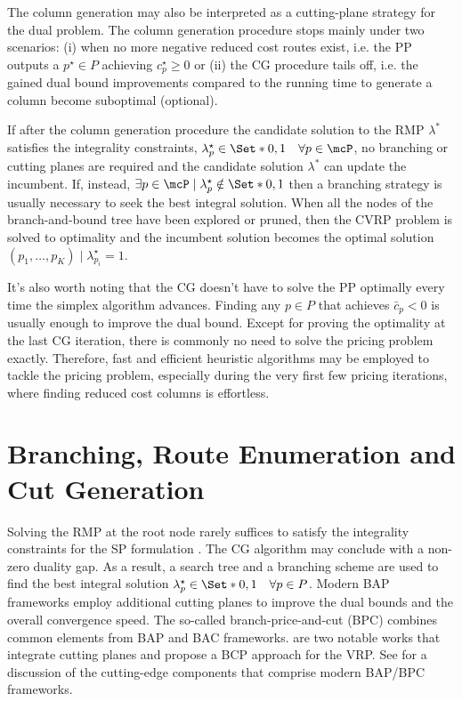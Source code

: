 The column generation may also be interpreted
as a cutting-plane strategy for the dual problem.
The column generation procedure stops mainly under two scenarios:
(i) when no more negative reduced cost routes exist,
i.e. the PP outputs a $p^\star \in P$ achieving $c^\star_p \ge 0$
or
(ii) the CG procedure tails off,
i.e. the gained dual bound improvements
compared to the running time to generate a column
become suboptimal (optional).

If after the column generation procedure
the candidate solution to the RMP $\lambda^*$ satisfies the integrality constraints,
$\lambda^\star_p \in \Set*{0, 1} \quad \forall p \in \mcP$,
no branching or cutting planes are required
and the candidate solution $\lambda^*$ can update the incumbent.
If, instead,
$\exists p \in \mcP \mid \lambda^\star_p \notin \Set*{0, 1}$
then a branching strategy is usually necessary
to seek the best integral solution.
When all the nodes of the branch-and-bound tree have been explored or pruned,
then the CVRP problem is solved to optimality
and the incumbent solution becomes the optimal solution
$(p_1, \dots, p_K) \mid \lambda^\star_{p_i} = 1$.

\medskip

It's also worth noting that
the CG doesn't have to solve the PP optimally
every time the simplex algorithm advances.
Finding any $p \in P$ that achieves $\bar{c}_p < 0$ is usually enough to improve the dual bound.
Except for proving the optimality at the last CG iteration,
there is commonly no need to solve the pricing problem exactly.
Therefore, fast and efficient heuristic algorithms may be employed
to tackle the pricing problem,
especially during the very first few pricing iterations,
where finding reduced cost columns is effortless.

\section{Branching, Route Enumeration and Cut Generation}
\label{sec:branching-and-cut-generation-within-bap-frameworks}

Solving the RMP at the root node rarely suffices to satisfy
the integrality constraints for the SP formulation
.
The CG algorithm may conclude with a non-zero duality gap.
As a result,
a search tree and a branching scheme are used to find
the best integral solution $\lambda^\star_p \in \Set*{0, 1} \quad \forall p \in P$.
Modern BAP frameworks employ additional cutting planes
to improve the dual bounds and the overall convergence speed.
The so-called branch-price-and-cut (BPC)
combines common elements from BAP and BAC frameworks.
\textcite{fukasawa2006, ropke2012} are two notable works that integrate
cutting planes and propose a BCP approach for the VRP.
See \textcite{sadykov2019modern} for a discussion of the cutting-edge components
that comprise modern BAP/BPC frameworks.

